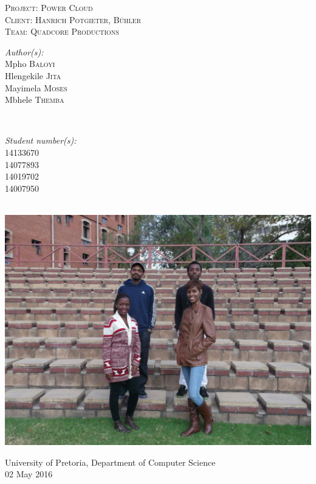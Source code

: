 \documentclass[a4paper,12pt]{article}
\begin{document}
\begin{titlepage}
\center

\textsc{\LARGE Project: Power Cloud}\\[1.5cm]
\textsc{\Large Client: Hanrich Potgieter, B{\"u}hler}\\[0.5cm]
\textsc{\large Team: Quadcore Productions}\\[0.5cm]

\begin{minipage}{0.4\textwidth}
\begin{flushleft} \large
\emph{Author(s):}\\
Mpho \textsc{Baloyi}\\
Hlengekile \textsc{Jita}\\
Mayimela \textsc{Moses}\\
Mbhele \textsc{Themba}\\
\end{flushleft}
\end{minipage}
~
\begin{minipage}{0.4\textwidth}
\begin{flushright} \large
\emph{Student number(s):} \\
14133670\\ %
14077893\\
14019702\\
14007950\\
\end{flushright}
\end{minipage}\\

\includegraphics[width=\textwidth]{images/GroupPhoto}

{\large University of Pretoria, Department of Computer Science}\\

{\large 02 May 2016}\\[3cm]

\vfil

\end{titlepage}
\newpage
\tableofcontents
\newpage
\end{document}
